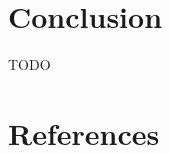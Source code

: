 \documentclass{article}
\begin{document}
\section{Conclusion}

TODO

%

\section*{References}



\end{document}
